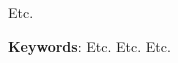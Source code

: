 %
%

\begin{ABSTRACT}
	
		\noindent Etc.

		\vspace*{0.5cm}\noindent\textbf{Keywords}: Etc. Etc. Etc.
		
\end{ABSTRACT}
